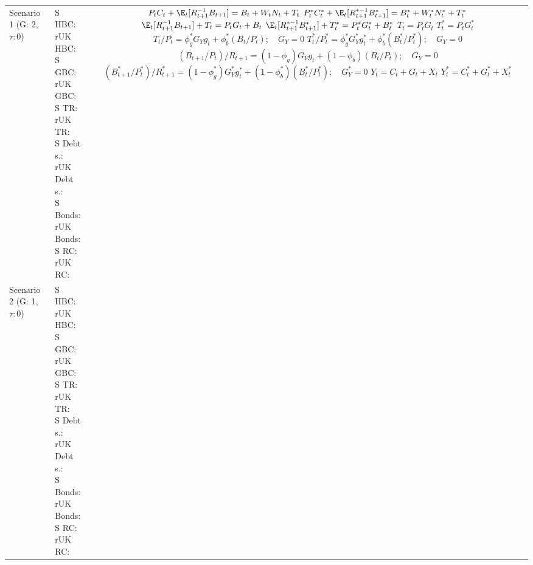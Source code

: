 
\renewcommand{\arraystretch}{10}
\begin{table}[H]
    \centering
    \begin{tabular}{l|l c}
    \makecell{Scenario 1 \\ (G: 2, $\tau: 0$)} &  \makecell{S HBC: \\ rUK HBC: \\ S GBC: \\ rUK GBC: \\ S TR: \\ rUK TR: \\ S Debt s.:\\ rUK Debt s.:\\ S Bonds: \\ rUK Bonds: \\ S RC: \\ rUK RC:} & 
        \makecell{
            $P_t C_t + \E_t [{R^{-1}_{t+1}}B_{t+1}] = B_t + W_t N_t + T_t$ \\
            $P^*_t C^*_t + \E_t [{R^{*-1}_{t+1}}B^*_{t+1}] = B^*_t + W^*_t N^*_t + T^*_t$ \\
            $\E_t [{R^{-1}_{t+1}}B_{t+1}] + T_t = P_tG_t + B_t$\\
            $\E_t [{R^{*-1}_{t+1}}B^*_{t+1}] + T^*_t = P^*_tG^*_t + B^*_t$ \\
            $T_t = P_tG_t$ \\
            $T^*_t = P_tG^*_t$ \\
            $T_t / P_t = \phi^*_g G_Y g_t + \phi^*_b(B_t / P_t); \quad G_Y = 0$\\
            $T^*_t / P^*_t = \phi^*_g G^*_Y g^*_t + \phi^*_b(B^*_t / P^*_t); \quad G_Y = 0$\\
            $(B_{t+1} / P_t) / R_{t+1} = (1-\phi_g) G_Y g_t + (1-\phi_b)(B_t / P_t); \quad G_Y = 0$\\
            $(B^*_{t+1} / P^*_t) / R^*_{t+1} = (1-\phi^*_g) G^*_Y g^*_t + (1-\phi^*_b)(B^*_t / P^*_t); \quad G^*_Y = 0$\\
            $Y_t = C_t + G_t + X_t$ \\
            $Y^*_t = C^*_t + G^*_t + X^*_t$
        }  \\ 
    \makecell{Scenario 2 \\ (G: 1, $\tau: 0$)} &  \makecell{S HBC: \\ rUK HBC: \\ S GBC: \\ rUK GBC: \\ S TR: \\ rUK TR:\\ S Debt s.:\\ rUK Debt s.:\\ S Bonds: \\ rUK Bonds: \\ S RC: \\ rUK RC:} & 

\end{tabular}
\end{table}
